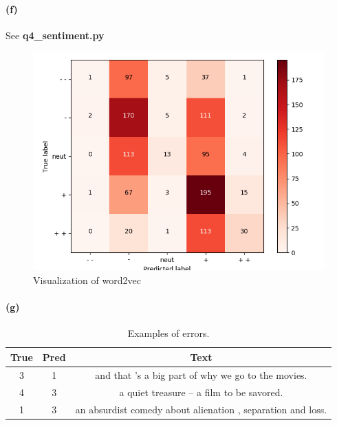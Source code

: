 \documentclass{article}
\begin{document}
\begin{spacing}{1.5}
\paragraph{(f)}See \textbf{q4\_sentiment.py}
\begin{figure}
  \centering
  \includegraphics[width=\textwidth]{q4_dev_conf}
  \caption{Visualization of word2vec}\label{fig:3} 
\end{figure}

\paragraph{(g)}
\begin{table}
\centering
\caption{Examples of errors.}\label{Tbl:1}
\begin{tabular}{ |c|c|c| }
  \hline
  True & Pred & Text \\
  \hline
  3 & 1 & and that 's a big part of why we go to the movies. \\
  \hline
  4 & 3 & a quiet treasure -- a film to be savored. \\
  \hline
  1 & 3 & an absurdist comedy about alienation , separation and loss. \\
  \hline
\end{tabular}
\end{table}

\end{spacing}
\end{document}
